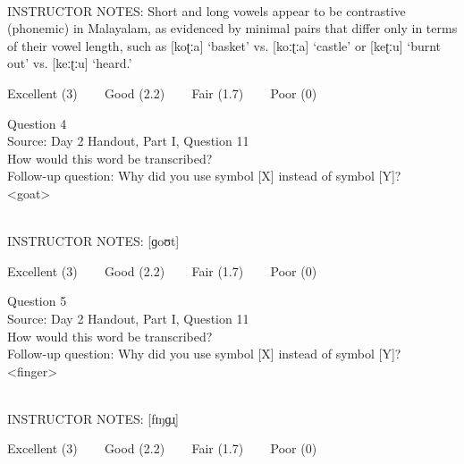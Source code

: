 \documentclass[12pt]{article}
\begin{document}
~\\
INSTRUCTOR NOTES: Short and long vowels appear to be contrastive (phonemic) in Malayalam, as evidenced by minimal pairs that differ only in terms of their vowel length, such as [koʈːa] ‘basket’ vs. [koːʈːa] ‘castle’ or [keʈːu] ‘burnt out’ vs. [keːʈːu] ‘heard.’


\vfill
Excellent (3) ~~~ Good (2.2) ~~~ Fair (1.7) ~~~ Poor (0)
\newpage

{\large Question 4}\\

Source: Day 2 Handout, Part I, Question 11\\

How would this word be transcribed?\\ Follow-up question: Why did you use symbol [X] instead of symbol [Y]?\\

<goat>


~\\
INSTRUCTOR NOTES: [ɡoʊt]


\vfill
Excellent (3) ~~~ Good (2.2) ~~~ Fair (1.7) ~~~ Poor (0)
\newpage

{\large Question 5}\\

Source: Day 2 Handout, Part I, Question 11\\

How would this word be transcribed?\\ Follow-up question: Why did you use symbol [X] instead of symbol [Y]?\\

<finger>


~\\
INSTRUCTOR NOTES: [fɪŋɡɹ̩]


\vfill
Excellent (3) ~~~ Good (2.2) ~~~ Fair (1.7) ~~~ Poor (0)
\newpage

\begin{center}
\textbf{{\color{red}{\HUGE END OF EXAM}}}\\

\end{center}
\newpage

\begin{center}
\textbf{{\color{blue}{\HUGE START OF EXAM\\}}}

\textbf{{\color{blue}{\HUGE Student ID: 4656\\}}}

\textbf{{\color{blue}{\HUGE 2:00 - 2:15 PM\\}}}

\end{center}
\newpage
\end{document}
